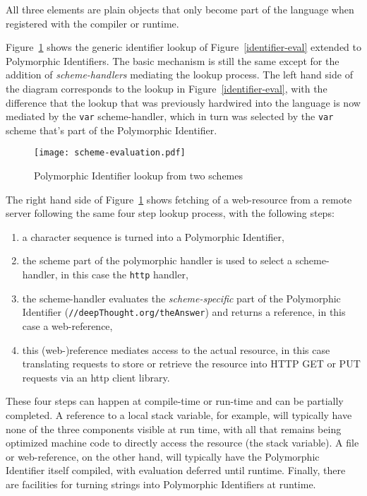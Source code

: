 \documentclass[preprint]{sigplanconf}
\begin{document}
All three elements are plain objects that only become part of the language when registered
with the compiler or runtime.

Figure~\ref{scheme-eval} shows the generic identifier lookup of Figure~\ref{identifier-eval}
extended to Polymorphic Identifiers.  The basic mechanism is still the same except for the
addition of \emph{scheme-handlers} mediating the lookup process.  The left hand side of the
diagram corresponds to the lookup in Figure~\ref{identifier-eval}, with the difference that
the lookup that was previously hardwired into the language is now mediated by the {\tt var}
scheme-handler, which in turn was selected by the {\tt var} scheme that's part of the 
Polymorphic Identifier.


\begin{figure}[htbp]
\centering\texttt{[image: scheme-evaluation.pdf]}
\caption{Polymorphic Identifier lookup from two schemes}
\label{scheme-eval}
\end{figure}


The right hand side of Figure~\ref{scheme-eval} shows fetching of a web-resource from
a remote server following the same four step lookup process, with the following steps:

\begin{enumerate}
\item a character sequence is turned into a Polymorphic Identifier,
\item the scheme part of the polymorphic handler is used to select a scheme-handler, in this case the {\tt http} handler,
\item the scheme-handler evaluates the \emph{scheme-specific} part of the Polymorphic Identifier ({\tt //deepThought.org/theAnswer})
	 and returns a reference, in this case a web-reference,
\item this (web-)reference mediates access to the actual resource, in this case translating requests to store or retrieve the 
	resource into HTTP GET or PUT requests via an http client library.
\end{enumerate}

These four steps can happen at compile-time or run-time and can be partially completed.
A reference to a local stack variable, for example, will typically have none of the
three components visible at run time, with all that remains being optimized 
machine code to directly access the resource (the stack variable).
A file or web-reference, on the other hand, will typically have the Polymorphic Identifier itself
compiled, with evaluation deferred until runtime.  Finally, there are facilities
for turning strings into Polymorphic Identifiers at runtime.
\end{document}
